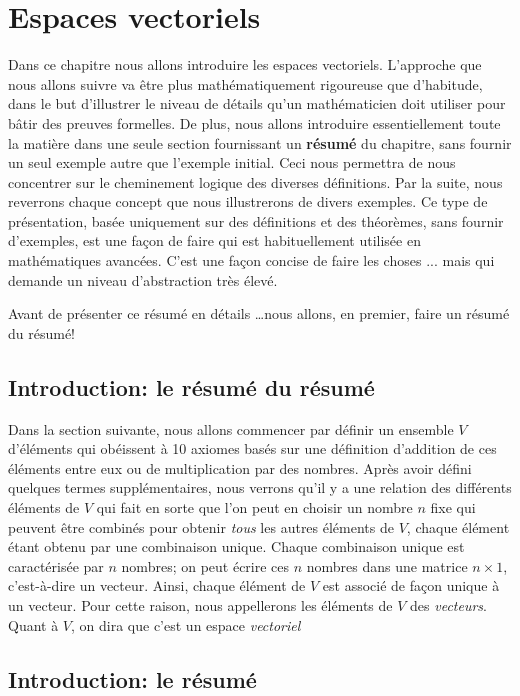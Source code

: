 \chapter{Espaces vectoriels}

Dans ce chapitre nous allons introduire les espaces vectoriels.  L'approche que nous allons suivre
va être plus mathématiquement rigoureuse que d'habitude, dans le but d'illustrer le niveau de
détails qu'un mathématicien doit utiliser pour bâtir des preuves formelles.  De plus, nous
allons introduire essentiellement toute la matière dans une seule section fournissant
un \textbf{résumé} du chapitre, sans
fournir un seul exemple autre que l'exemple initial.
 Ceci nous permettra de nous concentrer sur le cheminement
logique des diverses définitions. Par la suite, nous reverrons chaque concept que nous
illustrerons de divers exemples.  Ce type de présentation, basée uniquement sur
des définitions et des théorèmes, sans fournir d'exemples, est une façon de faire
qui est habituellement utilisée en mathématiques avancées.  C'est une
façon concise de faire les choses ... mais qui demande un niveau d'abstraction très
élevé.  



Avant de présenter ce résumé en détails \ldots nous allons, en premier, faire un résumé du résumé!

\section{Introduction: le résumé du résumé}

Dans la section suivante, nous allons commencer par définir un ensemble $V$ d'éléments 
qui obéissent à 10 axiomes basés sur une définition d'addition de ces éléments 
entre eux ou de multiplication par des nombres.  
Après avoir défini quelques termes supplémentaires, nous verrons qu'il y a 
une relation des différents éléments de $V$ qui fait en sorte que l'on peut en choisir un nombre $n$ fixe
qui peuvent être combinés pour obtenir \textit{tous} les autres éléments de $V$, chaque élément
étant obtenu par une combinaison unique.  Chaque combinaison unique est caractérisée
par $n$ nombres; on peut écrire ces $n$ nombres dans une matrice $n\times 1$, c'est-à-dire
un vecteur.  Ainsi, chaque élément de $V$ est associé de façon unique à un vecteur.
Pour cette raison, nous appellerons les éléments de $V$ des \textit{vecteurs}.  Quant à $V$,
on dira que c'est un espace \textit{vectoriel}


\section{Introduction: le résumé}

